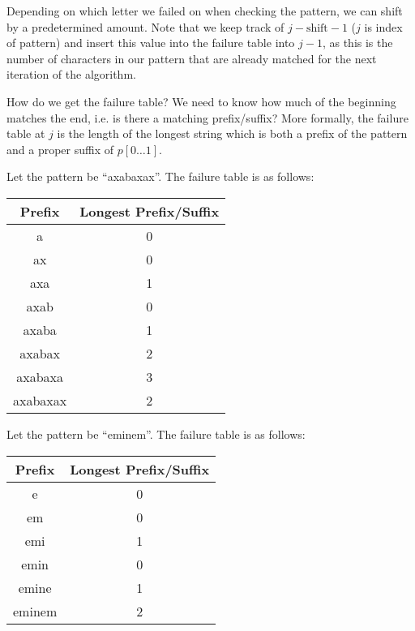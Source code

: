 
Depending on which letter we failed on when checking the pattern, we can shift by a predetermined amount. Note that we keep track of \( j - \text{shift} - 1 \) (\( j \) is index of pattern) and insert this value into the failure table into \( j-1 \), as this is the number of characters in our pattern that are already matched for the next iteration of the algorithm.

How do we get the failure table? We need to know how much of the beginning matches the end, i.e. is there a matching prefix/suffix? More formally, the failure table at \( j \) is the length of the longest string which is both a prefix of the pattern and a proper suffix of \( p[0\ldots 1] \).

\begin{eg}
	Let the pattern be ``axabaxax''. The failure table is as follows:
	\begin{center}
		\begin{tabular}{|c|c|}
			\hline
			\textbf{Prefix} & \textbf{Longest Prefix/Suffix} \\
			\hline
			a & 0 \\
			ax & 0 \\
			axa & 1 \\
			axab & 0 \\
			axaba & 1 \\
			axabax & 2 \\
			axabaxa & 3 \\
			axabaxax & 2 \\
			\hline
		\end{tabular}
	\end{center}
\end{eg}

\begin{eg}
	Let the pattern be ``eminem''. The failure table is as follows:
	\begin{center}
		\begin{tabular}{|c|c|}
			\hline
			\textbf{Prefix} & \textbf{Longest Prefix/Suffix} \\
			\hline
			e & 0 \\
			em & 0 \\
			emi & 1 \\
			emin & 0 \\
			emine & 1 \\
			eminem & 2 \\
			\hline
		\end{tabular}
	\end{center}
\end{eg}

